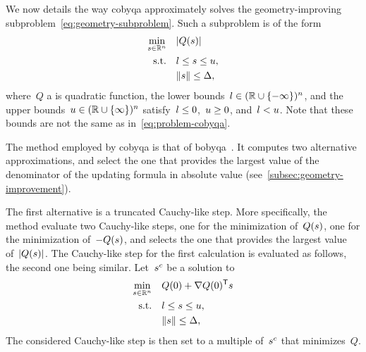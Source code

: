 We now details the way \gls{cobyqa} approximately solves the geometry-improving subproblem~\cref{eq:geometry-subproblem}.
Such a subproblem is of the form
\begin{subequations}
    \label{eq:geometry-simple}
    \begin{align}
        \min_{\sstep \in \R^n}  & \quad \abs{Q(\sstep)}\\
        \text{s.t.}             & \quad \xl \le \sstep \le \xu,\\
                                & \quad \norm{\sstep} \le \rad,
    \end{align}
\end{subequations}
where~$Q$ a is quadratic function, the lower bounds~$l \in (\mathbb{R} \cup \{-\infty\})^n$, and the upper bounds~$u \in (\mathbb{R} \cup \{\infty\})^n$ satisfy~$l \le 0$,~$u \ge 0$, and~$l < u$.
Note that these bounds are not the same as in~\cref{eq:problem-cobyqa}.

The method employed by \gls{cobyqa} is that of \gls{bobyqa}~\cite{Powell_2009}.
It computes two alternative approximations, and select the one that provides the largest value of the denominator of the updating formula in absolute value (see~\cref{subsec:geometry-improvement}).

The first alternative is a truncated Cauchy-like step.
More specifically, the method evaluate two Cauchy-like steps, one for the minimization of~$Q(\sstep)$, one for the minimization of~$-Q(\sstep)$, and selects the one that provides the largest value of~$\abs{Q(\sstep)}$.
The Cauchy-like step for the first calculation is evaluated as follows, the second one being similar.
Let~$\sstep[c]$ be a solution to
\begin{align*}
    \min_{\sstep \in \R^n}  & \quad Q(0) + \nabla Q(0)^{\T} \sstep\\
    \text{s.t.}             & \quad \xl \le \sstep \le \xu,\\
                            & \quad \norm{\sstep} \le \rad,
\end{align*}
The considered Cauchy-like step is then set to a multiple of~$\sstep[c]$ that minimizes~$Q$.

